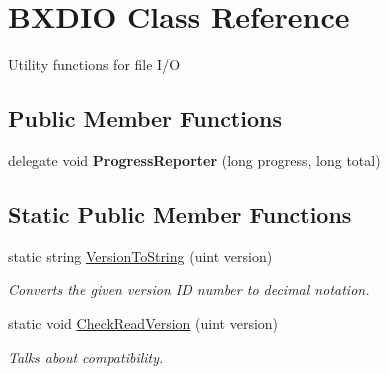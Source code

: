 \hypertarget{class_b_x_d_i_o}{}\section{B\+X\+D\+IO Class Reference}
\label{class_b_x_d_i_o}


Utility functions for file I/O  


\subsection*{Public Member Functions}
\begin{DoxyCompactItemize}
\item 
\mbox{\label{class_b_x_d_i_o_ace978077206667e2e20c5581a83222e2}} 
delegate void {\bfseries Progress\+Reporter} (long progress, long total)
\end{DoxyCompactItemize}
\subsection*{Static Public Member Functions}
\begin{DoxyCompactItemize}
\item 
static string \hyperlink{class_b_x_d_i_o_acb44b034d14e68cf66c3bcd4b0eb0fc0}{Version\+To\+String} (uint version)
\begin{DoxyCompactList}\small\item\em Converts the given version ID number to decimal notation. \end{DoxyCompactList}\item 
static void \hyperlink{class_b_x_d_i_o_ae7803ce0f645dd421430706f86b35ebf}{Check\+Read\+Version} (uint version)
\begin{DoxyCompactList}\small\item\em Talks about compatibility. \end{DoxyCompactList}\end{DoxyCompactItemize}
